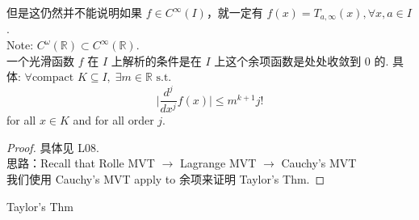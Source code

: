 \begin{remark}
   但是这仍然并不能说明如果 $f \in C^{\infty}(I)$，就一定有 $f(x) = T_{a, \infty}(x), \forall x,a \in I$. \\
   Note:  $C^\omega (\mathbb{R}) \subset C^\infty(\mathbb{R}).$\\
    一个光滑函数 $f$ 在 $I$ 上解析的条件是在 $I$ 上这个余项函数是处处收敛到 0 的.
    具体: $
    \forall \text{compact } K \subseteq I, \; \exists m \in \mathbb{R} \text { s.t. } $
    $$
    \bigg |\frac{d^j}{dx^j} f(x) \bigg | \leq m^{k+1} j! 
    $$
    for all $x \in K$ and for all order $j$.
\end{remark}

\begin{proof}
    具体见 L08.\\
    思路：Recall that Rolle MVT $\rightarrow$ Lagrange MVT $\rightarrow$ Cauchy's MVT\\
    我们使用 Cauchy's MVT apply to 余项来证明 Taylor's Thm.
\end{proof}


\begin{theorem}{Taylor's Thm}\label{Taylor's Thm}
    
\end{theorem}












